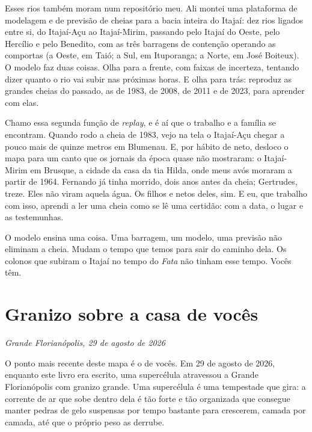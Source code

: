\documentclass[
  brazilian,
  11pt,
  openany]{book}
\begin{document}
Esses rios também moram num repositório meu. Ali montei uma plataforma
de modelagem e de previsão de cheias para a bacia inteira do Itajaí: dez
rios ligados entre si, do Itajaí-Açu ao Itajaí-Mirim, passando pelo
Itajaí do Oeste, pelo Hercílio e pelo Benedito, com as três barragens de
contenção operando as comportas (a Oeste, em Taió; a Sul, em Ituporanga;
a Norte, em José Boiteux). O modelo faz duas coisas. Olha para a frente,
com faixas de incerteza, tentando dizer quanto o rio vai subir nas
próximas horas. E olha para trás: reproduz as grandes cheias do passado,
as de 1983, de 2008, de 2011 e de 2023, para aprender com elas.

Chamo essa segunda função de \emph{replay}, e é aí que o trabalho e a
família se encontram. Quando rodo a cheia de 1983, vejo na tela o
Itajaí-Açu chegar a pouco mais de quinze metros em Blumenau. E, por
hábito de neto, desloco o mapa para um canto que os jornais da época
quase não mostraram: o Itajaí-Mirim em Brusque, a cidade da casa da tia
Hilda, onde meus avós moraram a partir de 1964. Fernando já tinha
morrido, dois anos antes da cheia; Gertrudes, treze. Eles não viram
aquela água. Os filhos e netos deles, sim. E eu, que trabalho com isso,
aprendi a ler uma cheia como se lê uma certidão: com a data, o lugar e
as testemunhas.

O modelo ensina uma coisa. Uma barragem, um modelo, uma previsão não
eliminam a cheia. Mudam o tempo que temos para sair do caminho dela. Os
colonos que subiram o Itajaí no tempo do \emph{Fata} não tinham esse
tempo. Vocês têm.

\section{Granizo sobre a casa de
vocês}\label{granizo-sobre-a-casa-de-vocuxeas}

\emph{Grande Florianópolis, 29 de agosto de 2026}

O ponto mais recente deste mapa é o de vocês. Em 29 de agosto de 2026,
enquanto este livro era escrito, uma supercélula atravessou a Grande
Florianópolis com granizo grande. Uma supercélula é uma tempestade que
gira: a corrente de ar que sobe dentro dela é tão forte e tão organizada
que consegue manter pedras de gelo suspensas por tempo bastante para
crescerem, camada por camada, até que o próprio peso as derrube.
\end{document}
